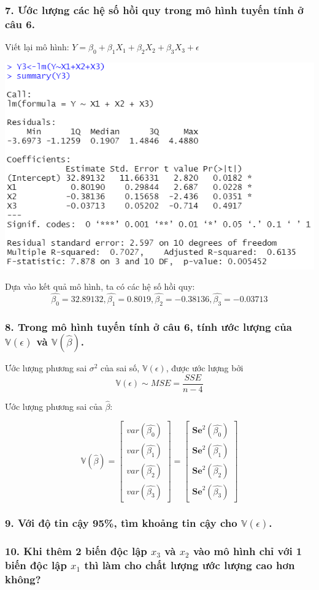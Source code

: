 \documentclass[a4paper]{article}
\theoremstyle{nonumberplain}
\begin{document}
\subsubsection*{7. Ước lượng các hệ số hồi quy trong mô hình tuyến tính ở câu 6.}
Viết lại mô hình: $Y = \beta_0 + \beta_1 X_1 + \beta_2 X_2 + \beta_3 X_3 + \epsilon$

\begin{center}
\includegraphics{bai3_6.PNG} 
\end{center}
Dựa vào kết quả mô hình, ta có các hệ số hồi quy:
$$\hat{\beta_0} = 32.89132, \hat{\beta_1} = 0.8019, \hat{\beta_2} = -0.38136, \hat{\beta_3} = -0.03713$$
\subsubsection*{8. Trong mô hình tuyến tính ở câu 6, tính ước lượng của $\mathbb{V}(\epsilon)$ và $\mathbb{V}(\hat{\beta})$.}

Ước lượng phương sai $\sigma^2$ của sai số, $\mathbb{V}(\epsilon)$, được ước lượng bởi 
$$\mathbb{V}(\epsilon) \sim MSE = \displaystyle \frac{SSE}{n-4}$$

Ước lượng phương sai của $\hat{\beta}$:

\[\mathbb{V}(\hat{\beta}) = \left[ {\begin{array}{*{20}{c}}
  var(\hat{\beta_0}) \\
  var(\hat{\beta_1})  \\
   var(\hat{\beta_2})\\
 var(\hat{\beta_3})
\end{array}} \right] = \left[ {\begin{array}{*{20}{c}}
  \mathbf{Se}^2(\hat{\beta_0}) \\
  \mathbf{Se}^2(\hat{\beta_1})  \\
   \mathbf{Se}^2(\hat{\beta_2})\\
 \mathbf{Se}^2(\hat{\beta_3})
\end{array}} \right]\]

\subsubsection*{9. Với độ tin cậy 95\%, tìm khoảng tin cậy cho $\mathbb{V}(\epsilon)$. }


\subsubsection*{10. Khi thêm 2 biến độc lập $x_3$ và $x_2$ vào mô hình chỉ với 1 biến độc lập $x_1$ thì làm cho chất
lượng ước lượng cao hơn không?}
\end{document}
